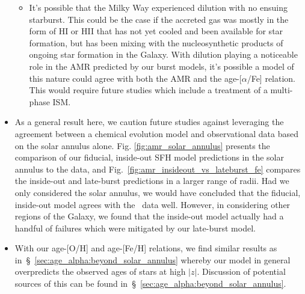 \documentclass[fleqn, usenatbib]{mnras}
\begin{document}
\begin{itemize}
\begin{itemize}
		\item It's possible that the Milky Way experienced dilution with no 
		ensuing starburst. This could be the case if the accreted gas was 
		mostly in the form of HI or HII that has not yet cooled and been 
		available for star formation, but has been mixing with the 
		nucleosynthetic products of ongoing star formation in the Galaxy. With 
		dilution playing a noticeable role in the AMR predicted by our burst 
		models, it's possible a model of this nature could agree with both 
		the AMR and the age-[$\alpha$/Fe] relation. This would require 
		future studies which include a treatment of a multi-phase ISM. 
	\end{itemize} 

	\item As a general result here, we caution future studies against 
	leveraging the agreement between a chemical evolution model and 
	observational data based on the solar annulus alone. Fig. 
	\ref{fig:amr_solar_annulus} presents the comparison of our fiducial, 
	inside-out SFH model predictions in the solar annulus to the 
	\citet{Feuillet2019} data, and Fig.~\ref{fig:amr_insideout_vs_lateburst_fe} 
	compares the inside-out and late-burst predictions in a larger range of 
	radii. Had we only considered the solar annulus, we would have concluded 
	that the fiducial, inside-out model agrees with the~\citet{Feuillet2019} 
	data well. However, in considering other regions of the Galaxy, we found 
	that the inside-out model actually had a handful of failures which were 
	mitigated by our late-burst model. 

	\item With our age-[O/H] and age-[Fe/H] relations, we find similar results 
	as in~\S~\ref{sec:age_alpha:beyond_solar_annulus} whereby our model 
	in general overpredicts the observed ages of stars at high 
	$\left|z\right|$. Discussion of potential sources of this can be found 
	in~\S~\ref{sec:age_alpha:beyond_solar_annulus}. 
\end{itemize} 
\end{document}
